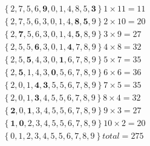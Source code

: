 \begin{align*}
&\left\{2,7,5,6,\mathbf{9},0,1,4,8,5,\mathbf{3}\right\} 1 \times 11 = 11\\
&\left\{2,7,5,6,3,0,1,4,\mathbf{8},\mathbf{5},9\right\} 2 \times 10 = 20\\
&\left\{2,\mathbf{7},5,6,3,0,1,4,\mathbf{5},8,9\right\} 3 \times  9 = 27\\
&\left\{2,5,5,\mathbf{6},3,0,1,\mathbf{4},7,8,9\right\} 4 \times  8 = 32\\
&\left\{2,5,\mathbf{5},4,3,0,\mathbf{1},6,7,8,9\right\} 5 \times  7 = 35\\
&\left\{2,\mathbf{5},1,4,3,\mathbf{0},5,6,7,8,9\right\} 6 \times  6 = 36\\
&\left\{2,0,1,\mathbf{4},\mathbf{3},5,5,6,7,8,9\right\} 7 \times  5 = 35\\
&\left\{2,0,1,\mathbf{3},4,5,5,6,7,8,9\right\} 8 \times  4 = 32\\
&\left\{\mathbf{2},0,\mathbf{1},3,4,5,5,6,7,8,9\right\} 9 \times  3 = 27\\
&\left\{\mathbf{1},\mathbf{0},2,3,4,5,5,6,7,8,9\right\}10 \times  2 = 20\\
&\left\{0,1,2,3,4,5,5,6,7,8,9\right\} total = 275
\end{align*}
